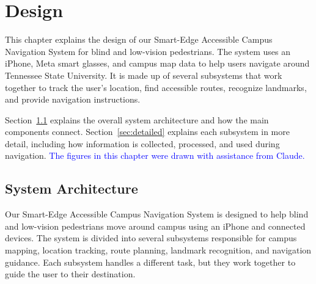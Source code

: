 \providecommand{\upd}[1]{\textcolor{blue}{#1}}
\providecommand{\note}[1]{\textcolor{red}{#1}}
\providecommand{\fignote}[1]{{\color{red}\noindent\textbf{Note from Dr.\ Sekmen.} Figure~\ref{#1} shows suggested components for this subsystem. Check it, update it if needed, and explain each component.\par}}
\providecommand{\eqnote}{{\color{red}\noindent\textbf{Note from Dr.\ Sekmen.} This equation is a suggestion. Check it, and keep it with your own explanation only if you use this method.\par}}

\chapter{Design}
This chapter explains the design of our Smart-Edge Accessible Campus Navigation System for blind and low-vision pedestrians. The system uses an iPhone, Meta smart glasses, and campus map data to help users navigate around Tennessee State University. It is made up of several subsystems that work together to track the user's location, find accessible routes, recognize landmarks, and provide navigation instructions.

Section~\ref{sec:architecture} explains the overall system architecture and how the main components connect. Section~\ref{sec:detailed} explains each subsystem in more detail, including how information is collected, processed, and used during navigation. \upd{The figures in this chapter were drawn with assistance from Claude.}

\section{System Architecture}
\label{sec:architecture}

Our Smart-Edge Accessible Campus Navigation System is designed to help blind and low-vision pedestrians move around campus using an iPhone and connected devices. The system is divided into several subsystems responsible for campus mapping, location tracking, route planning, landmark recognition, and navigation guidance. Each subsystem handles a different task, but they work together to guide the user to their destination.

